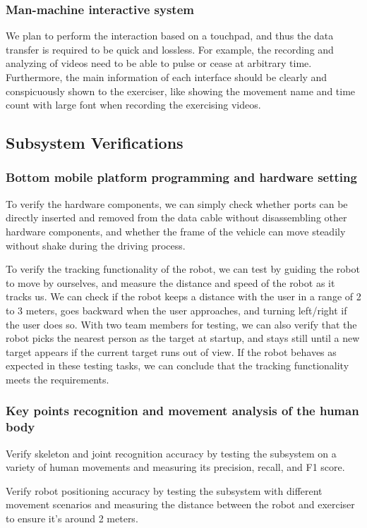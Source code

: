 \subsubsection{Man-machine interactive system}
We plan to perform the interaction based on a touchpad, and thus the data transfer is required to be quick and lossless. For example, the recording and analyzing of videos need to be able to pulse or cease at arbitrary time. Furthermore, the main information of each interface should be clearly and conspicuously shown to the exerciser, like showing the movement name and time count with large font when recording the exercising videos.


\subsection{Subsystem Verifications}
\subsubsection{Bottom mobile platform programming and hardware setting}
To verify the hardware components, we can simply check whether ports can be directly inserted and removed from the data cable without disassembling other hardware components, and whether the frame of the vehicle can move steadily without shake during the driving process.

To verify the tracking functionality of the robot, we can test by guiding the robot to move by ourselves, and measure the distance and speed of the robot as it tracks us. We can check if the robot keeps a distance with the user in a range of 2 to 3 meters, goes backward when the user approaches, and turning left/right if the user does so. With two team members for testing, we can also verify that the robot picks the nearest person as the target at startup, and stays still until a new target appears if the current target runs out of view. If the robot behaves as expected in these testing tasks, we can conclude that the tracking functionality meets the requirements.
\subsubsection{Key points recognition and movement analysis of the human body}
Verify skeleton and joint recognition accuracy by testing the subsystem on a variety of human movements and measuring its precision, recall, and F1 score.

Verify robot positioning accuracy by testing the subsystem with different movement scenarios and measuring the distance between the robot and exerciser to ensure it's around 2 meters.

